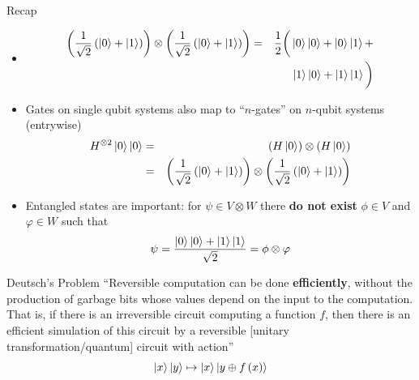 \documentclass{beamer}
\begin{document}
\begin{frame}{Recap}
\begin{itemize}
  \item[] 
    \begin{eqnarray*}
    \left(\frac{1}{\sqrt{2}}\left(\Ket{0}+\Ket{1}\right)\right)\otimes\left(\frac{1}{\sqrt{2}}\left(\Ket{0}+\Ket{1}\right)\right) &=&  \frac{1}{2}\bigg(\Ket{0}\Ket{0}+\Ket{0}\Ket{1}+\\
    &&\Ket{1}\Ket{0}+\Ket{1}\Ket{1}\bigg)
    \end{eqnarray*}
  \item Gates on single qubit systems also map to ``$n$-gates'' on $n$-qubit systems (entrywise)
    \begin{eqnarray*}
      H^{\otimes 2}\Ket{0}\Ket{0} & = & \left(H\Ket{0}\right)\otimes\left(H\Ket{0}\right)\\
                               & = & \left(\frac{1}{\sqrt{2}}\left(\Ket{0}+\Ket{1}\right)\right)\otimes\left(\frac{1}{\sqrt{2}}\left(\Ket{0}+\Ket{1}\right)\right)\\  
    \end{eqnarray*}
  \item Entangled states are important: for $\psi \in V\otimes W$ there \textbf{do not exist} $\phi \in V$ and $\varphi \in W$ such that
    \[
     \psi=\frac{\Ket{0}\Ket{0}+\Ket{1}\Ket{1}}{\sqrt{2}}=\phi\otimes\varphi
    \]
\end{itemize}
\end{frame}




\begin{frame}{Deutsch's Problem}
``Reversible computation can be done \textbf{efficiently}, without the production of garbage bits whose values depend on the input to the computation. That is, if there is an irreversible circuit computing a function $f$, then there is an efficient simulation of this circuit by a reversible [unitary transformation/quantum] circuit with action''\cite{Nielsen:2011:QCQ:1972505}
\[
\Ket{x}\Ket{y}\mapsto\Ket{x}\Ket{y\oplus f\left(x\right)}
\]

\end{frame}
\end{document}
